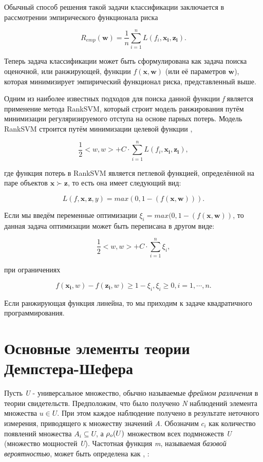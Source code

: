 \documentclass[12pt,a4paper,oneside]{article}
\begin{document}
\par
Обычный способ решения такой задачи классификации заключается в рассмотрении эмпирического функционала риска

\[
R_{emp}(\mathbf{w}) = \frac{1}{n} \sum \limits_{i=1}^n L(f_i, \mathbf{x_i}, \mathbf{z_i}).
\]

Теперь задача классификации может быть сформулирована как задача поиска оценочной, или ранжирующей, функции \(f(\mathbf{x}, \mathbf{w})\) (или её параметров \(\mathbf{w}\)), которая минимизирует эмпирический функционал риска, представленный выше. 

\par
Одним из наиболее известных подходов для поиска данной функции \emph{f} является применение метода RankSVM, который строит модель ранжирования путём минимизации регуляризируемого отступа на основе парных потерь. 
Модель RankSVM строится путём минимизации целевой функции , 

\[
\frac{1}{2} <w, w> + C \cdot \sum \limits_{i=1}^n L(f_i, \mathbf{x_i}, \mathbf{z_i}),
\]

где функция потерь в RankSVM является петлевой функцией, определённой на паре объектов \(\mathbf{x} \succ \mathbf{z}\), то есть она имеет следующий вид:

\[
L(f, \mathbf{x}, \mathbf{z}, y) = max(0, 1 - (f(\mathbf{x}, \mathbf{w}))).
\]

Если мы введём переменные оптимизации \(\xi_i = max(0, 1 - (f(\mathbf{x}, \mathbf{w}))\), то данная задача оптимизации может быть переписана в другом виде:

\[
\frac{1}{2}<w, w> + C \cdot \sum \limits_{i=1}^n \xi_i,
\]

при ограничениях

\[
f(\mathbf{x_i}, w) - f(\mathbf{z_i}, w) \geq 1 - \xi_i, 
\xi_i \geq 0, i = 1, \cdots, n.
\]

Если ранжирующая функция линейна, то мы приходим к задаче квадратичного программирования.


\section{Основные элементы теории Демпстера-Шефера}
\label{sec:dst_definitions}

\par
Пусть \emph{U} - универсальное множество, обычно называемые \emph{фреймом различения} в теории свидетельств. 
Предположим, что было получено \emph{N} наблюдений элемента множества \(u \in U\).
При этом каждое наблюдение получено в результате неточного измерения, приводящего к множеству значений \emph{A}.
Обозначим \(c_i\) как количество появлений множества \(A_i \subseteq U\), а \(\mathrm{\rho}_o(U)\) множеством всех подмножеств \emph{U} (множество мощностей \emph{U}).
Частотная функция \emph{m}, называемая \emph{базовой вероятностью}, может быть определена как , :
\end{document}
